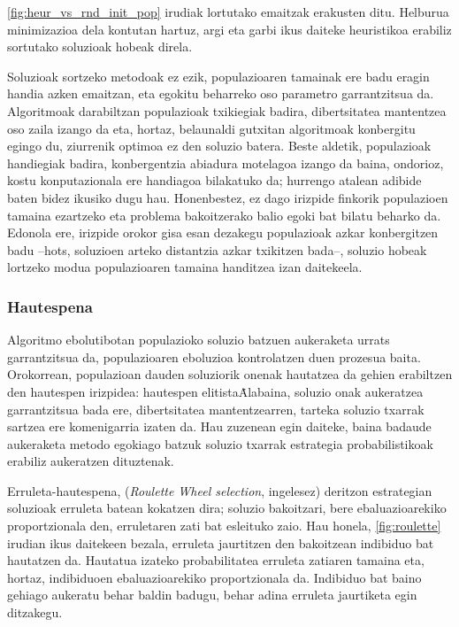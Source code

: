 \documentclass[eu]{ifirak}\usepackage[]{graphicx}\usepackage[]{color}
\newcommand{\zkk}{\guillemotleft}
\newcommand{\skk}{\guillemotright}
\begin{document}
\ref{fig:heur_vs_rnd_init_pop} irudiak lortutako emaitzak erakusten ditu. Helburua minimizazioa dela kontutan hartuz, argi eta garbi ikus daiteke heuristikoa erabiliz sortutako soluzioak hobeak direla.

Soluzioak sortzeko metodoak ez ezik, populazioaren tamainak ere badu eragin handia azken emaitzan, eta  egokitu beharreko oso parametro garrantzitsua da. Algoritmoak darabiltzan populazioak txikiegiak badira, dibertsitatea mantentzea oso zaila izango da eta, hortaz, belaunaldi gutxitan algoritmoak konbergitu egingo du, ziurrenik optimoa ez den soluzio batera. Beste aldetik, populazioak handiegiak badira, konbergentzia abiadura motelagoa izango da baina, ondorioz, kostu konputazionala ere handiagoa bilakatuko da; hurrengo atalean adibide baten bidez ikusiko dugu hau. Honenbestez, ez dago irizpide finkorik populazioen tamaina ezartzeko eta problema bakoitzerako balio egoki bat bilatu beharko da. Edonola ere, irizpide orokor gisa esan dezakegu populazioak azkar konbergitzen badu --hots, soluzioen arteko distantzia azkar txikitzen bada--, soluzio hobeak lortzeko modua populazioaren tamaina handitzea izan daitekeela. 


\subsubsection{Hautespena}

Algoritmo ebolutibotan populazioko soluzio batzuen aukeraketa urrats garrantzitsua da, populazioaren eboluzioa kontrolatzen duen prozesua baita. Orokorrean, populazioan dauden soluziorik onenak hautatzea da gehien erabiltzen den hautespen irizpidea: hautespen \zkk elitista\skk\. Alabaina, soluzio onak aukeratzea garrantzitsua bada ere, dibertsitatea mantentzearren, tarteka soluzio txarrak sartzea ere komenigarria izaten da. Hau zuzenean egin daiteke, baina badaude aukeraketa metodo egokiago batzuk soluzio txarrak estrategia probabilistikoak erabiliz aukeratzen dituztenak.

Erruleta-hautespena,  (\textit{Roulette Wheel selection}, ingelesez) deritzon estrategian soluzioak erruleta batean kokatzen dira; soluzio bakoitzari, bere ebaluazioarekiko proportzionala den, erruletaren zati bat esleituko zaio. Hau honela, \ref{fig:roulette} irudian ikus daitekeen bezala, erruleta jaurtitzen den bakoitzean indibiduo bat hautatzen da. Hautatua izateko probabilitatea erruleta zatiaren tamaina eta, hortaz, indibiduoen ebaluazioarekiko proportzionala da. Indibiduo bat baino gehiago aukeratu behar baldin badugu, behar adina erruleta jaurtiketa egin ditzakegu. 
\end{document}
